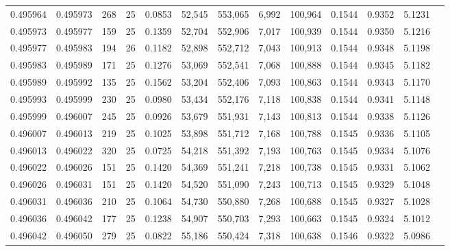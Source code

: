 \begin{tabular}{rrrrrrrrrrrrr}
0.495964 & 0.495973 & 268 &  25 &                                     0.0853 &  52,545 & 553,065 &   6,992 & 100,964 & 0.1544 & 0.9352 & 5.1231 \\
0.495973 & 0.495977 & 159 &  25 &                                     0.1359 &  52,704 & 552,906 &   7,017 & 100,939 & 0.1544 & 0.9350 & 5.1216 \\
0.495977 & 0.495983 & 194 &  26 &                                     0.1182 &  52,898 & 552,712 &   7,043 & 100,913 & 0.1544 & 0.9348 & 5.1198 \\
0.495983 & 0.495989 & 171 &  25 &                                     0.1276 &  53,069 & 552,541 &   7,068 & 100,888 & 0.1544 & 0.9345 & 5.1182 \\
0.495989 & 0.495992 & 135 &  25 &                                     0.1562 &  53,204 & 552,406 &   7,093 & 100,863 & 0.1544 & 0.9343 & 5.1170 \\
0.495993 & 0.495999 & 230 &  25 &                                     0.0980 &  53,434 & 552,176 &   7,118 & 100,838 & 0.1544 & 0.9341 & 5.1148 \\
0.495999 & 0.496007 & 245 &  25 &                                     0.0926 &  53,679 & 551,931 &   7,143 & 100,813 & 0.1544 & 0.9338 & 5.1126 \\
0.496007 & 0.496013 & 219 &  25 &                                     0.1025 &  53,898 & 551,712 &   7,168 & 100,788 & 0.1545 & 0.9336 & 5.1105 \\
0.496013 & 0.496022 & 320 &  25 &                                     0.0725 &  54,218 & 551,392 &   7,193 & 100,763 & 0.1545 & 0.9334 & 5.1076 \\
0.496022 & 0.496026 & 151 &  25 &                                     0.1420 &  54,369 & 551,241 &   7,218 & 100,738 & 0.1545 & 0.9331 & 5.1062 \\
0.496026 & 0.496031 & 151 &  25 &                                     0.1420 &  54,520 & 551,090 &   7,243 & 100,713 & 0.1545 & 0.9329 & 5.1048 \\
0.496031 & 0.496036 & 210 &  25 &                                     0.1064 &  54,730 & 550,880 &   7,268 & 100,688 & 0.1545 & 0.9327 & 5.1028 \\
0.496036 & 0.496042 & 177 &  25 &                                     0.1238 &  54,907 & 550,703 &   7,293 & 100,663 & 0.1545 & 0.9324 & 5.1012 \\
0.496042 & 0.496050 & 279 &  25 &                                     0.0822 &  55,186 & 550,424 &   7,318 & 100,638 & 0.1546 & 0.9322 & 5.0986 \\

\end{tabular}
